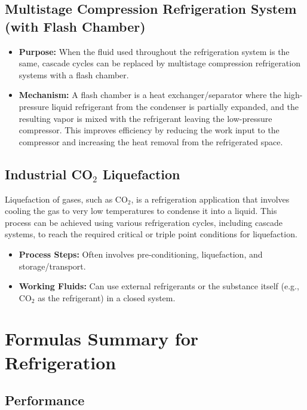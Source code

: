 \subsection{Multistage Compression Refrigeration System (with Flash Chamber)}
\begin{itemize}
    \item \textbf{Purpose:} When the fluid used throughout the refrigeration system is the same, cascade cycles can be replaced by multistage compression refrigeration systems with a flash chamber.
    \item \textbf{Mechanism:} A flash chamber is a heat exchanger/separator where the high-pressure liquid refrigerant from the condenser is partially expanded, and the resulting vapor is mixed with the refrigerant leaving the low-pressure compressor. This improves efficiency by reducing the work input to the compressor and increasing the heat removal from the refrigerated space.
\end{itemize}

\subsection{Industrial CO$_2$ Liquefaction}
Liquefaction of gases, such as CO$_2$, is a refrigeration application that involves cooling the gas to very low temperatures to condense it into a liquid. This process can be achieved using various refrigeration cycles, including cascade systems, to reach the required critical or triple point conditions for liquefaction.
\begin{itemize}
    \item \textbf{Process Steps:} Often involves pre-conditioning, liquefaction, and storage/transport.
    \item \textbf{Working Fluids:} Can use external refrigerants or the substance itself (e.g., CO$_2$ as the refrigerant) in a closed system.
\end{itemize}

\section{Formulas Summary for Refrigeration}

\subsection{Performance}
